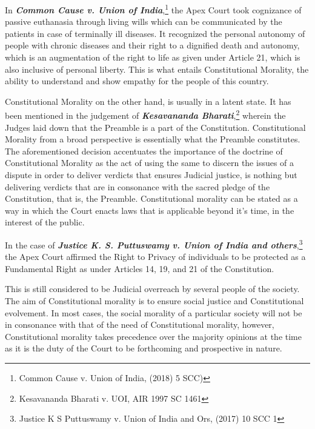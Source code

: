 \begin{multicols}{2}
\noi
In \textbf{\textit{Common Cause v. Union of India}},\footnote{Common Cause v. Union of India, (2018) 5 SCC)}  the Apex Court took cognizance of passive
euthanasia through living wills which can be communicated by the patients in case of
terminally ill diseases. It recognized the personal autonomy of people with chronic diseases
and their right to a dignified death and autonomy, which is an augmentation of the right to
life as given under Article 21, which is also inclusive of personal liberty. This is what entails
Constitutional Morality, the ability to understand and show empathy for the people of this
country. 

\noi
Constitutional Morality on the other hand, is usually in a latent state. It has been mentioned in
the judgement of \textbf{\textit{Kesavananda Bharati}},\footnote{Kesavananda Bharati v. UOI, AIR 1997 SC 1461 } wherein the Judges laid down that the Preamble is
a part of the Constitution. Constitutional Morality from a broad perspective is essentially
what the Preamble constitutes. The aforementioned decision accentuates the importance of
the doctrine of Constitutional Morality as the act of using the same to discern the issues of a
dispute in order to deliver verdicts that ensures Judicial justice, is nothing but delivering
verdicts that are in consonance with the sacred pledge of the Constitution, that is, the
Preamble. Constitutional morality can be stated as a way in which the Court enacts laws that
is applicable beyond it’s time, in the interest of the public. 

\noi
In the case of \textbf{\textit{Justice K. S. Puttuswamy v. Union of India and others}},\footnote{Justice K S Puttuswamy v. Union of India and Ors, (2017) 10 SCC 1} the Apex Court
affirmed the Right to Privacy of individuals to be protected as a Fundamental Right as under
Articles 14, 19, and 21 of the Constitution.

\noi
This is still considered to be Judicial overreach by several people of the society. The aim of
Constitutional morality is to ensure social justice and Constitutional evolvement. In most
cases, the social morality of a particular society will not be in consonance with that of the
need of Constitutional morality, however, Constitutional morality takes precedence over the
majority opinions at the time as it is the duty of the Court to be forthcoming and prospective
in nature.



\end{multicols}
